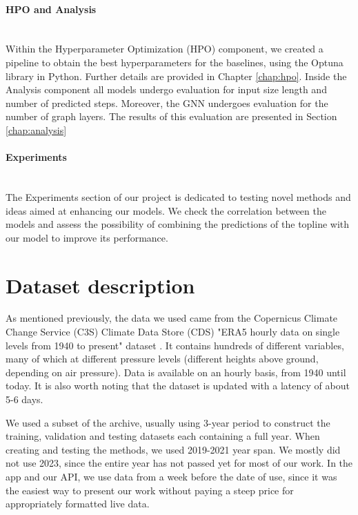 \paragraph{HPO and Analysis} \mbox{} \\
\noindent Within the Hyperparameter Optimization (HPO) component, we created a pipeline to obtain the best hyperparameters for the baselines, using the Optuna library in Python. Further details are provided in Chapter \ref{chap:hpo}.
Inside the Analysis component all models undergo evaluation for input size length and number of predicted steps. Moreover, the GNN undergoes evaluation for the number of graph layers. The results of this evaluation are presented in Section \ref{chap:analysis}

\paragraph{Experiments} \mbox{} \\
\noindent The Experiments section of our project is dedicated to testing novel methods and ideas aimed at enhancing our models. We check the correlation between the models and assess the possibility of combining the predictions of the topline with our model to improve its performance.

\section{Dataset description}\label{chap:dataset}
As mentioned previously, the data we used came from the Copernicus Climate Change Service (C3S) Climate Data Store (CDS) "ERA5 hourly data on single levels from 1940 to present" dataset \cite{ERA5}. It contains hundreds of different variables, many of which at different pressure levels (different heights above ground, depending on air pressure). Data is available on an hourly basis, from 1940 until today. It is also worth noting that the dataset is updated with a latency of about 5-6 days.

We used a subset of the archive, usually using 3-year period to construct the training, validation and testing datasets each containing a full year. When creating and testing the methods, we used 2019-2021 year span. We mostly did not use 2023, since the entire year has not passed yet for most of our work. In the app and our API, we use data from a week before the date of use, since it was the easiest way to present our work without paying a steep price for appropriately formatted live data.

